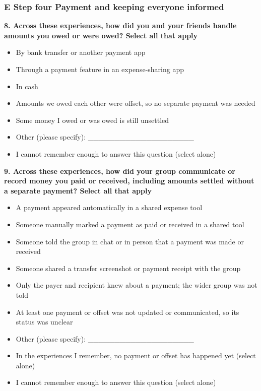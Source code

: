 \subsubsection*{E Step four Payment and keeping everyone informed}

\par\smallskip\noindent\textbf{8. Across these experiences, how did you and your friends handle amounts you owed or were owed? Select all that apply}\par\nobreak

\begin{itemize}
\item
  By bank transfer or another payment app
\item
  Through a payment feature in an expense-sharing app
\item
  In cash
\item
  Amounts we owed each other were offset, so no separate payment was needed
\item
  Some money I owed or was owed is still unsettled
\item
  Other (please specify): \_\_\_\_\_\_\_\_\_\_\_\_\_\_\_\_\_\_\_\_
\item
  I cannot remember enough to answer this question (select alone)
\end{itemize}

\par\smallskip\noindent\textbf{9. Across these experiences, how did your group communicate or record money you paid or received, including amounts settled without a separate payment? Select all that apply}\par\nobreak

\begin{itemize}
\item
  A payment appeared automatically in a shared expense tool
\item
  Someone manually marked a payment as paid or received in a shared tool
\item
  Someone told the group in chat or in person that a payment was made or received
\item
  Someone shared a transfer screenshot or payment receipt with the group
\item
  Only the payer and recipient knew about a payment; the wider group was not told
\item
  At least one payment or offset was not updated or communicated, so its status was unclear
\item
  Other (please specify): \_\_\_\_\_\_\_\_\_\_\_\_\_\_\_\_\_\_\_\_
\item
  In the experiences I remember, no payment or offset has happened yet (select alone)
\item
  I cannot remember enough to answer this question (select alone)
\end{itemize}

